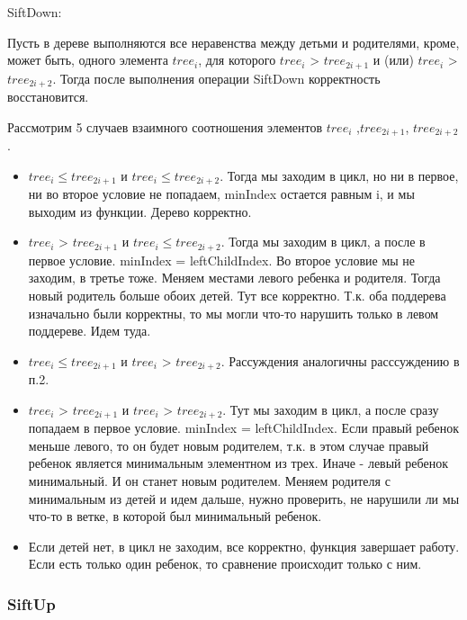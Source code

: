 \Correctness SiftDown:

Пусть в дереве выполняются все неравенства между детьми и родителями, кроме, может быть, одного элемента $tree_i$, для которого $tree_i$ > $tree_{2i + 1}$ и (или) $tree_i$ > $tree_{2i+2}$. Тогда после выполнения операции SiftDown корректность восстановится.


Рассмотрим 5 случаев взаимного соотношения элементов $tree_{i}$ ,$tree_{2i+1}$, $tree_{2i+2}$.
\begin{itemize}
    \item $tree_{i} \leq tree_{2i + 1}$ и $tree_{i} \leq tree_{2i+2}$. Тогда мы заходим в цикл, но ни в первое, ни во второе условие не попадаем, minIndex остается равным i, и мы выходим из функции. Дерево корректно.

    \item $tree_{i}$ > $tree_{2i + 1}$ и $tree_{i} \leq tree_{2i+2}$. Тогда мы заходим в цикл, а после в первое условие. minIndex = leftChildIndex. Во второе условие мы не заходим, в третье тоже. Меняем местами левого ребенка и родителя. Тогда новый родитель больше обоих детей. Тут все корректно. Т.к. оба поддерева изначально были корректны, то мы могли что-то нарушить только в левом поддереве. Идем туда.
     \item $tree_{i} \leq tree_{2i + 1}$ и $tree_{i}$ > $tree_{2i+2}$. Рассуждения аналогичны расссуждению в п.2.
     \item $tree_{i}$ > $tree_{2i + 1}$ и $tree_{i}$ > $tree_{2i+2}$. Тут мы заходим в цикл, а после сразу попадаем в первое условие. minIndex = leftChildIndex.
     Если правый ребенок меньше левого, то он будет новым родителем, т.к. в этом случае правый ребенок является минимальным элементном из трех. Иначе - левый ребенок минимальный. И он станет новым родителем. Меняем родителя с минимальным из детей и идем дальше, нужно проверить, не нарушили  ли мы что-то в ветке, в которой был минимальный ребенок.
    
    \item Если детей нет, в цикл не заходим, все корректно, функция завершает работу. Если есть только один ребенок, то сравнение происходит только с ним. \Endproof
\end{itemize} 

\subsubsection*{SiftUp}

